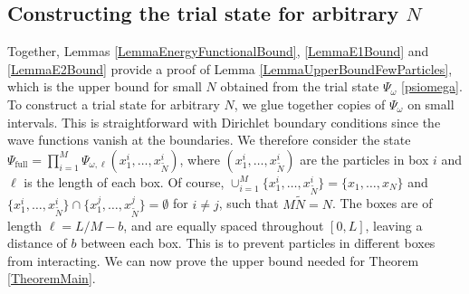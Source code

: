 \documentclass[a4paper,11pt]{article}
\numberwithin{equation}{section}
\begin{document}
\subsection{Constructing the trial state for arbitrary $N$}
\label{secarbN}
Together, Lemmas \ref{LemmaEnergyFunctionalBound}, \ref{LemmaE1Bound} and \ref{LemmaE2Bound} provide a proof of Lemma \ref{LemmaUpperBoundFewParticles}, which is the upper bound for small $N$ obtained from the trial state $\Psi_\omega$ \eqref{psiomega}. To construct a trial state for arbitrary $N$, we glue together copies of $\Psi_\omega$ on small intervals. This is straightforward with Dirichlet boundary conditions since the wave functions vanish at the boundaries. We therefore consider the state $ \Psi_{\text{full}}=\prod_{i=1}^{M}\Psi_{\omega,\ell}(x^i_1,\dots,x^i_{\tilde{N}}) $, where $ (x_1^i,\dots,x_{\tilde{N}}^i) $ are the particles in box $ i $ and $ \ell $ is the length of each box. Of course, $ \cup_{i=1}^{M}\{x_1^i,\dots,x_{\tilde{N}}^i\}=\{x_1,\dots,x_N\} $ and $ \{x_1^i,\dots,x_{\tilde{N}}^i\}\cap\{x_1^j,\dots,x_{\tilde{N}}^j\}=\emptyset $ for $ i\neq j $, such that $ M\tilde{N}=N $. The boxes are of length $ \ell=L/M-b $, and are equally spaced throughout $ [0,L] $, leaving a distance of $ b $ between each box. This is to prevent particles in different boxes from interacting. We can now prove the upper bound needed for Theorem \ref{TheoremMain}. 
\end{document}
